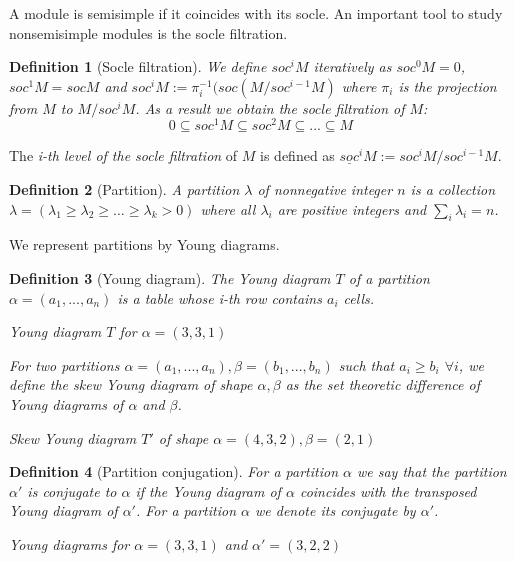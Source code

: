 \documentclass[letterpaper,11pt]{article}
\newtheorem{definition}{Definition}
\begin{document}
	A module is semisimple if it coincides with its socle. An important tool to study nonsemisimple modules is the socle filtration.
	
	\begin{definition}[Socle filtration]
		We define $soc^i M$ iteratively as $soc^0 M = 0$, $soc^1 M = soc M$ and $soc^i M := \pi^{-1}_i (soc(M/soc^{i-1}M)$ where $\pi_i$ is the projection from $M$ to $M/soc^i M$. As a result we obtain the socle filtration of $M$: 
		$$0 \subseteq soc^1 M \subseteq soc^2 M \subseteq ... \subseteq M$$
	\end{definition}
	
	The \textit{i-th level of the socle filtration} of $M$ is defined as $\underline{soc}^i M:=soc^i M/soc^{i-1}M$.
	
	\begin{definition}[Partition]
		A partition $\lambda$ of nonnegative integer $n$ is a collection $\lambda = (\lambda_1 \ge \lambda_2 \ge \dots \ge \lambda_k > 0)$ where all $\lambda_i$ are positive integers and $\sum_{i}^{}\lambda_i=n$.
	\end{definition}
	
	We represent partitions by Young diagrams. 
	\begin{definition}[Young diagram]
		The Young diagram $T$ of a partition $\alpha=(a_1, ..., a_n)$ is a table whose i-th row contains $a_i$ cells. 
		
		{
			 \newline
			Young diagram $T$ for $\alpha = (3,3,1)$ \newline\par
		}
		
		For two partitions $\alpha=(a_1, ..., a_n), \beta=(b_1, ..., b_n)$ such that $a_i \ge b_i$  $\forall i$, we define the skew Young diagram of shape $\alpha, \beta$ as the set theoretic difference of Young diagrams of $\alpha$ and $\beta$.
		
		{
			\centering{\young(::\hfil\hfil,:\hfil\hfil,\hfil\hfil)} \newline
			Skew Young diagram $T'$ of shape $\alpha = (4,3,2), \beta=(2,1)$ \newline\par
		}
	\end{definition}
	
	\begin{definition}[Partition conjugation]
		For a partition $\alpha$ we say that the partition $\alpha'$ is conjugate to $\alpha$ if the Young diagram of $\alpha$ coincides with the transposed Young diagram of $\alpha'$. For a partition $\alpha$ we denote its conjugate by $\alpha'$.
		
		{
			 \newline
			Young diagrams for $\alpha = (3,3,1)$ and $\alpha'=(3,2,2)$ \newline\par
		}
	\end{definition}
	
\end{document}

